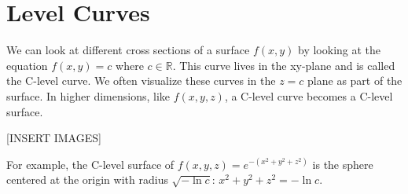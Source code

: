\section{Level Curves}
\noindent
We can look at different cross sections of a surface $f(x,y)$ by looking at the equation $f(x,y) = c$ where $c \in \mathbb{R}$. This curve lives in the xy-plane and is called the C-level curve. We often visualize these curves in the $z=c$ plane as part of the surface. In higher dimensions, like $f(x,y,z)$, a C-level curve becomes a C-level surface.

[INSERT IMAGES]

\noindent
For example, the C-level surface of $f(x,y,z) = e^{-\left(x^2+y^2+z^2\right)}$ is the sphere centered at the origin with radius $\sqrt{-\ln{c}}$: $x^2 + y^2 + z^ 2 =-\ln{c}$.